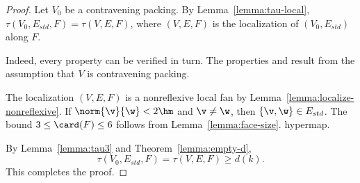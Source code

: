 \begin{proof}
  Let $V_0$ be a contravening packing.  By
  Lemma~\ref{lemma:tau-local}, $\tau(V_0,E_{std},F)=\tau(V,E,F)$, where
  $(V,E,F)$ is the localization of $(V_0,E_{std})$ along $F$.

    Indeed, every property can be
  verified in turn.  The properties  and 
  result from the assumption that $V$ is contravening packing.

  The localization $(V,E,F)$ is a nonreflexive local fan
by Lemma~\ref{lemma:localize-nonreflexive}.
 If $\norm{\v}{\w}<2\hm$ and $\v\ne \w$, then $\{\v,\w\}\in
E_{std}$.
%
%
 The bound $3\le \card(F)\le 6$
follows from Lemma~\ref{lemma:face-size}.
hypermap. 

By Lemma~\ref{lemma:tau3} and Theorem~\ref{lemma:empty-d}, 
\[ 
\tau(V_0,E_{std},F)=\tau(V,E,F) \ge d (k).
\] 
This completes the proof.
\end{proof}


